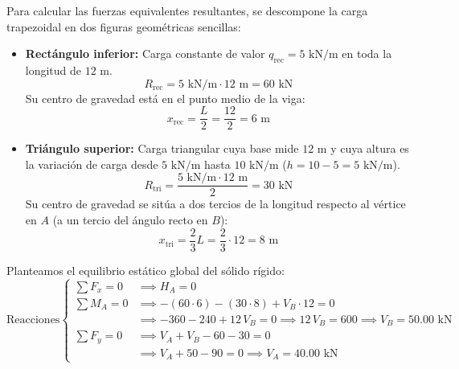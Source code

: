 
Para calcular las fuerzas equivalentes resultantes, se descompone la carga trapezoidal en dos figuras geométricas sencillas:
\begin{itemize}
    \item \textbf{Rectángulo inferior:} Carga constante de valor $q_{\text{rec}} = 5\text{ kN/m}$ en toda la longitud de $12\text{ m}$.
          \[
              R_{\text{rec}} = 5\text{ kN/m} \cdot 12\text{ m} = 60\text{ kN}
          \]
          Su centro de gravedad está en el punto medio de la viga:
          \[
              x_{\text{rec}} = \frac{L}{2} = \frac{12}{2} = 6\text{ m}
          \]
    \item \textbf{Triángulo superior:} Carga triangular cuya base mide $12\text{ m}$ y cuya altura es la variación de carga desde $5\text{ kN/m}$ hasta $10\text{ kN/m}$ ($h = 10 - 5 = 5\text{ kN/m}$).
          \[
              R_{\text{tri}} = \frac{5\text{ kN/m} \cdot 12\text{ m}}{2} = 30\text{ kN}
          \]
          Su centro de gravedad se sitúa a dos tercios de la longitud respecto al vértice en $A$ (a un tercio del ángulo recto en $B$):
          \[
              x_{\text{tri}} = \frac{2}{3}L = \frac{2}{3} \cdot 12 = 8\text{ m}
          \]
\end{itemize}

Planteamos el equilibrio estático global del sólido rígido:
\begin{equation}
    \text{Reacciones} \left\{
    \begin{aligned}
        \sum F_x = 0 & \implies \boxed{H_A = 0}                                                                        \\[6pt]
        \sum M_A = 0 & \implies -(60 \cdot 6) - (30 \cdot 8) + V_B \cdot 12 = 0                                        \\
                     & \implies -360 - 240 + 12\,V_B = 0 \implies 12\,V_B = 600 \implies \boxed{V_B = 50.00\text{ kN}} \\[6pt]
        \sum F_y = 0 & \implies V_A + V_B - 60 - 30 = 0                                                                \\
                     & \implies V_A + 50 - 90 = 0 \implies \boxed{V_A = 40.00\text{ kN}}
    \end{aligned}
    \right.
\end{equation}


